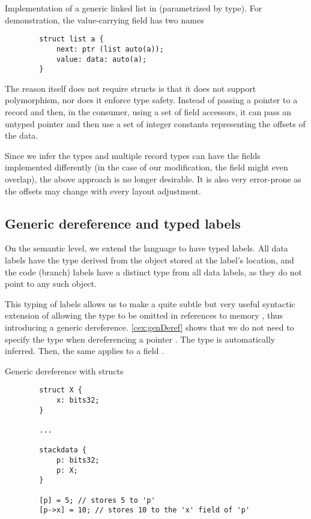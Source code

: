 \begin{codex}
    \caption{Implementation of a generic linked list in \cmm (parametrized by type). For demonstration, the value-carrying field has two names}
    \label{cex:list}

    \begin{lstlisting}
        struct list a {
            next: ptr (list auto(a));
            value: data: auto(a);
        }
    \end{lstlisting}
\end{codex}

The reason \cmm itself does not require structs is that it does not support polymorphism, nor does it enforce type safety. Instead of passing a pointer to a record and then, in the consumer, using a set of field accessors, it can pass an untyped pointer and then use a set of integer constants representing the offsets of the data.

Since we infer the types and multiple record types can have the fields implemented differently (in the case of our modification, the field might even overlap), the above approach is no longer desirable. It is also very error-prone as the offsets may change with every layout adjustment.

\subsection{Generic dereference and typed labels}
\label{sec:genDerefDef}

On the semantic level, we extend the language to have typed labels. All data labels have the type derived from the object stored at the label's location, and the code (branch) labels have a distinct type from all data labels, as they do not point to any such object.

This typing of labels allows us to make a quite subtle but very useful syntactic extension of allowing the type to be omitted in references to memory \cite{ramsey2005c}, thus introducing a generic dereference. \cref{cex:genDeref} shows that we do not need to specify the type when dereferencing a pointer . The type is automatically inferred. Then, the same applies to a  field .

\begin{codex}
    \caption{Generic dereference with structs}
    \label{cex:genDeref}
    \begin{lstlisting}
        struct X {
            x: bits32;
        }

        ...

        stackdata {
            p: bits32;
            p: X;
        }

        [p] = 5; // stores 5 to 'p'
        [p->x] = 10; // stores 10 to the 'x' field of 'p'
    \end{lstlisting}
\end{codex}

